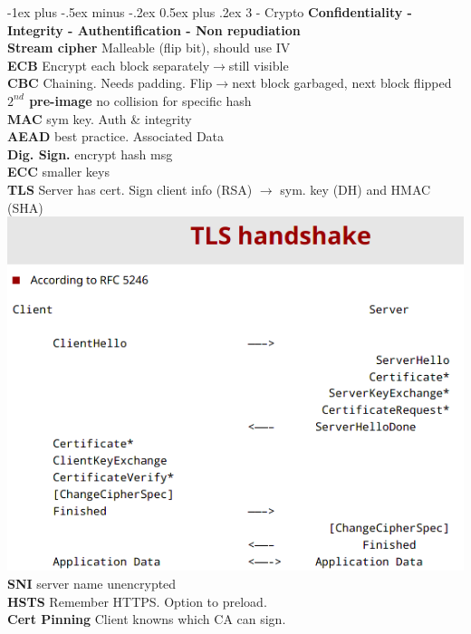 \documentclass[10pt,landscape]{article}
\makeatletter
\renewcommand{\section}{\@startsection{section}{1}{0mm}%
                                {-1ex plus -.5ex minus -.2ex}%
                                {0.5ex plus .2ex}%
                                {\normalfont\large\bfseries}}
\makeatother
\begin{document}
\begin{multicols*}{4}
\section{3 - Crypto}
\textbf{Confidentiality - Integrity - Authentification - Non repudiation}\\
\textbf{Stream cipher} Malleable (flip bit), should use IV\\
\textbf{ECB} Encrypt each block separately$\rightarrow$still visible\\
\textbf{CBC} Chaining. Needs padding. Flip$\rightarrow$next block garbaged, next block flipped\\
\textbf{$2^{nd}$ pre-image} no collision for specific hash\\
\textbf{MAC} sym key. Auth \& integrity\\
\textbf{AEAD} best practice. Associated Data\\
\textbf{Dig. Sign.} encrypt hash msg\\
\textbf{ECC} smaller keys\\
\textbf{TLS} Server has cert. Sign client info (RSA) $\rightarrow$ sym. key (DH) and HMAC (SHA)\\
\includegraphics[width=\columnwidth]{tls.png}
\textbf{SNI} server name unencrypted\\
\textbf{HSTS} Remember HTTPS. Option to preload.\\
\textbf{Cert Pinning} Client knowns which CA can sign.\\


\end{multicols*}
\end{document}

